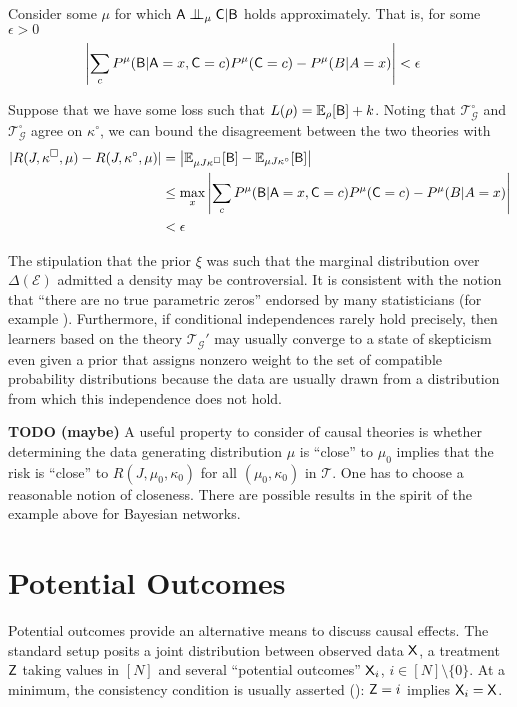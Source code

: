 Consider some $\mu$ for which $\RV{A} \CI_\mu \RV{C} | \RV{B}$ holds approximately. That is, for some $\epsilon>0$
\begin{align}
    \left|\sum_c P^\mu(\mathsf{B}|\mathsf{A}=x,\mathsf{C}=c)P^\mu(\mathsf{C}=c)-P^\mu(B|A=x)\right| &< \epsilon \label{eq:app_ci}
\end{align}

Suppose that we have some loss such that $L(\rho)= \mathbb{E}_\rho[\mathsf{B}] + k$. Noting that $\mathscr{T}^\circ_\mathcal{G}$ and $\mathscr{T}^\square_\mathcal{G}$ agree on $\kappa^\circ$, we can bound the disagreement between the two theories with
\begin{align}
    |R(J,\kappa^\square,\mu) - R(J,\kappa^\circ,\mu)| &=  \left|\mathbb{E}_{\mu J \kappa^\square} [\mathsf{B}] - \mathbb{E}_{\mu J \kappa^\circ} [\mathsf{B}]\right|\\
        &\leq \max_x \left|\sum_c P^\mu(\mathsf{B}|\mathsf{A}=x,\mathsf{C}=c)P^\mu(\mathsf{C}=c)-P^\mu(B|A=x) \right|\\
        &< \epsilon
\end{align}

The stipulation that the prior $\xi$ was such that the marginal distribution over $\Delta(\mathcal{E})$ admitted a density may be controversial. It is consistent with the notion that ``there are no true parametric zeros'' endorsed by many statisticians (for example  \cite{gelman_bayesian_2010,meehl_theory-testing_1967,berkson_difficulties_1938}). Furthermore, if conditional independences rarely hold precisely, then learners based on the theory $\mathscr{T}_{\mathcal{G}}'$ may usually converge to a state of skepticism even given a prior that assigns nonzero weight to the set of compatible probability distributions because the data are usually drawn from a distribution from which this independence does not hold.

\textbf{TODO (maybe)} A useful property to consider of causal theories is whether determining the data generating distribution $\mu$ is ``close'' to $\mu_0$ implies that the risk is ``close'' to $R(J,\mu_0,\kappa_0)$ for all $(\mu_0,\kappa_0)$ in $\mathscr{T}$. One has to choose a reasonable notion of closeness. There are possible results in the spirit of the example above for Bayesian networks.

\section{Potential Outcomes}

Potential outcomes provide an alternative means to discuss causal effects. The standard setup posits a joint distribution between observed data $\mathsf{X}$, a treatment $\mathsf{Z}$ taking values in $[N]$ and several ``potential outcomes'' $\mathsf{X}_i$, $i\in [N]\setminus\{0\}$. At a minimum, the consistency condition is usually asserted (\cite{richardson2013single}): $\mathsf{Z}=i$ implies $\mathsf{X}_i=\mathsf{X}$. 

